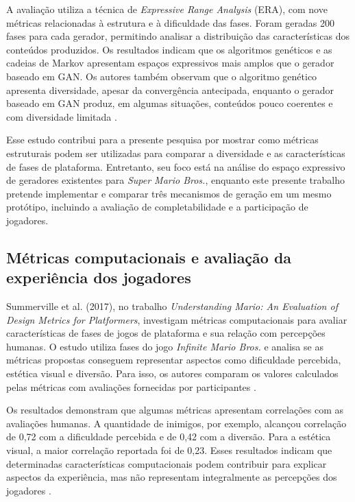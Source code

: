 A avaliação utiliza a técnica de
\textit{Expressive Range Analysis} (ERA), com
nove métricas relacionadas à estrutura e à
dificuldade das fases. Foram geradas 200 fases
para cada gerador, permitindo analisar a
distribuição das características dos conteúdos
produzidos. Os resultados indicam que os algoritmos 
genéticos e as cadeias de Markov apresentam espaços 
expressivos mais amplos que o gerador baseado em GAN. 
Os autores também observam que o algoritmo genético 
apresenta diversidade, apesar da convergência antecipada, 
enquanto o gerador baseado em GAN produz, em algumas 
situações, conteúdos pouco coerentes e com diversidade 
limitada \cite{SchaaBarriga2024}.

Esse estudo contribui para a presente pesquisa por
mostrar como métricas estruturais podem ser utilizadas
para comparar a diversidade e as características de
fases de plataforma. Entretanto, seu foco está na análise
do espaço expressivo de geradores existentes para 
\textit{Super Mario Bros.}, enquanto este presente 
trabalho pretende implementar e comparar três mecanismos 
de geração em um mesmo protótipo, incluindo a avaliação 
de completabilidade e a participação de jogadores.

\subsection{Métricas computacionais e avaliação da experiência dos jogadores}

Summerville et al. (2017), no trabalho \textit{Understanding
Mario: An Evaluation of Design Metrics for Platformers},
investigam métricas computacionais para avaliar
características de fases de jogos de plataforma e sua
relação com percepções humanas. O estudo utiliza fases
do jogo \textit{Infinite Mario Bros.} e analisa se as
métricas propostas conseguem representar aspectos como
dificuldade percebida, estética visual e diversão.
Para isso, os autores comparam os valores calculados
pelas métricas com avaliações fornecidas por participantes
\cite{Summerville2017}.

Os resultados demonstram que algumas métricas apresentam
correlações com as avaliações humanas. A quantidade
de inimigos, por exemplo, alcançou correlação de 0,72
com a dificuldade percebida e de 0,42 com a diversão.
Para a estética visual, a maior correlação reportada
foi de 0,23. Esses resultados indicam que determinadas
características computacionais podem contribuir para
explicar aspectos da experiência, mas não representam
integralmente as percepções dos jogadores
\cite{Summerville2017}.

